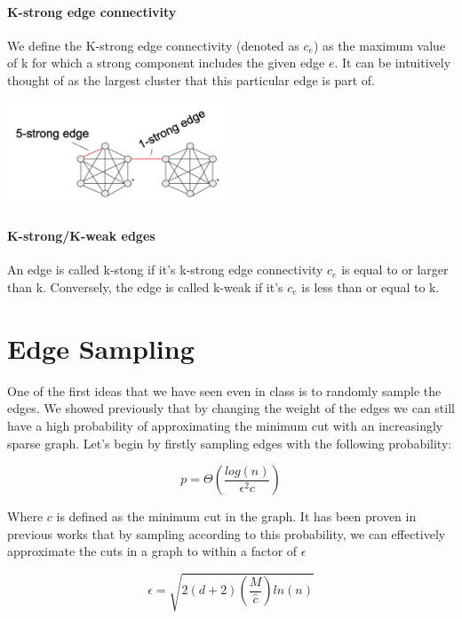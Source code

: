 \documentclass[11pt]{article}
\begin{document}
\paragraph{K-strong edge connectivity}
We define the K-strong edge connectivity (denoted as $c_e$) as the maximum value of k for which a strong component includes the given edge $e$. It can be intuitively thought of as the largest cluster that this particular edge is part of. 

\begin{center}
\includegraphics[width=0.5\textwidth]{figures/k_strong_edge_connectivity.png}
\end{center}

\paragraph{K-strong/K-weak edges}
An edge is called k-stong if it's k-strong edge connectivity $c_e$ is equal to or larger than k. Conversely, the edge is called k-weak if it's $c_e$ is less than or equal to k.

\section{Edge Sampling}

One of the first ideas that we have seen even in class is to randomly sample the edges. We showed previously that by changing the weight of the edges we can still have a high probability of approximating the minimum cut with an increasingly sparse graph. Let's begin by firstly sampling edges with the following probability:

\begin{equation}
    p = \Theta(\frac{log(n)}{\epsilon^2 c})
\end{equation}

Where $c$ is defined as the minimum cut in the graph. It has been proven in previous works \cite{Kar94a} that by sampling according to this probability, we can effectively approximate the cuts in a graph to within a factor of $\epsilon$

\begin{equation}
    \epsilon = \sqrt{2(d + 2)(\frac{M}{\hat{c}})ln(n)}
\end{equation}
\end{document}
